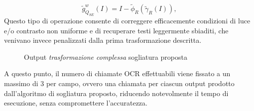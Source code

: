 \begin{equation}
	\label{eq:modified-top-hat}
	\tilde{g}_{Q_{SE}}^{w}(I) = I - \tilde{\phi}_{R}(\tilde{\gamma}_{R}(I)),
\end{equation}
Questo tipo di operazione consente di correggere efficacemente condizioni di luce e/o contrasto non uniforme e  di recuperare testi leggermente sbiaditi, che venivano invece penalizzati dalla prima trasformazione descritta.
\begin{figure}[H]
	\centering
	\caption{Output \textit{trasformazione complessa} sogliatura proposta}
	\label{fig:image-bin-proposed-approach-complex}
\end{figure}
A questo punto, il numero di chiamate OCR effettuabili viene fissato a un massimo di $3$ per campo, ovvero una chiamata per ciascun output prodotto dall'algoritmo di sogliatura proposto, riducendo notevolmente il tempo di esecuzione, senza compromettere l'accuratezza.

